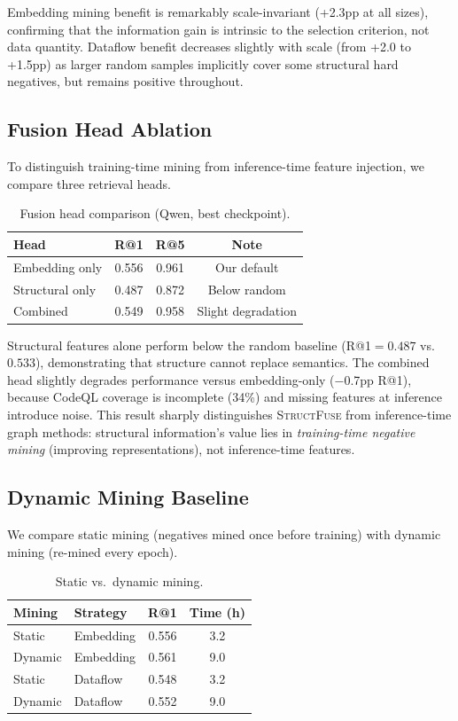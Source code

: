 \documentclass[11pt,a4paper]{article}
\newcommand{\ours}{\textsc{StructFuse}}
\begin{document}
Embedding mining benefit is remarkably scale-invariant (+2.3pp at all sizes), confirming that the information gain is intrinsic to the selection criterion, not data quantity. Dataflow benefit decreases slightly with scale (from +2.0 to +1.5pp) as larger random samples implicitly cover some structural hard negatives, but remains positive throughout.

\subsection{Fusion Head Ablation}

To distinguish training-time mining from inference-time feature injection, we compare three retrieval heads.

\begin{table}[t]
\centering
\small
\caption{Fusion head comparison (Qwen, best checkpoint).}
\label{tab:fusion}
\begin{tabular}{lccc}
\toprule
\textbf{Head} & \textbf{R@1} & \textbf{R@5} & \textbf{Note} \\
\midrule
Embedding only & 0.556 & 0.961 & Our default \\
Structural only & 0.487 & 0.872 & Below random \\
Combined & 0.549 & 0.958 & Slight degradation \\
\bottomrule
\end{tabular}
\end{table}

Structural features alone perform below the random baseline (R@1${}=0.487$ vs.\ $0.533$), demonstrating that structure cannot replace semantics. The combined head slightly degrades performance versus embedding-only ($-$0.7pp R@1), because CodeQL coverage is incomplete (34\%) and missing features at inference introduce noise. This result sharply distinguishes \ours{} from inference-time graph methods: structural information's value lies in \emph{training-time negative mining} (improving representations), not inference-time features.

\subsection{Dynamic Mining Baseline}

We compare static mining (negatives mined once before training) with dynamic mining (re-mined every epoch).

\begin{table}[t]
\centering
\small
\caption{Static vs.\ dynamic mining.}
\label{tab:dynamic}
\begin{tabular}{llcc}
\toprule
\textbf{Mining} & \textbf{Strategy} & \textbf{R@1} & \textbf{Time (h)} \\
\midrule
Static & Embedding & 0.556 & 3.2 \\
Dynamic & Embedding & 0.561 & 9.0 \\
Static & Dataflow & 0.548 & 3.2 \\
Dynamic & Dataflow & 0.552 & 9.0 \\
\bottomrule
\end{tabular}
\end{table}
\end{document}

